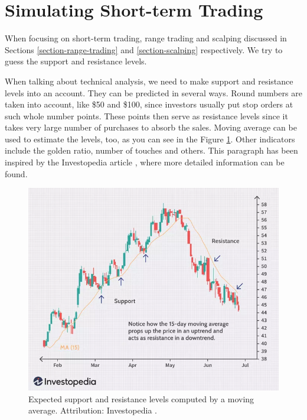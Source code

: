 \section{Simulating Short-term Trading}
\label{section-testing-day-trading}
When focusing on short-term trading, range trading and scalping discussed in Sections \ref{section-range-trading} and \ref{section-scalping} respectively. We try to guess the support and resistance levels.

When talking about technical analysis, we need to make support and resistance levels into an account. They can be predicted in several ways. Round numbers are taken into account, like \$50 and \$100, since investors usually put stop orders at such whole number points. These points then serve as resistance levels since it takes very large number of purchases to absorb the sales. Moving average can be used to estimate the levels, too, as you can see in the Figure \ref{figure-ma-support-resistance}. Other indicators include the golden ratio, number of touches and others. This paragraph has been inspired by the Investopedia article \cite{investopedia:support-and-resistance}, where more detailed information can be found.

\begin{figure}[!hbt]
    \centering
    \includegraphics[width=\columnwidth]{figures/ma-support-resistance.png}
    \caption{Expected support and resistance levels computed by a moving average. Attribution: Investopedia \cite{investopedia:support-and-resistance}.}
    \label{figure-ma-support-resistance}
\end{figure}

